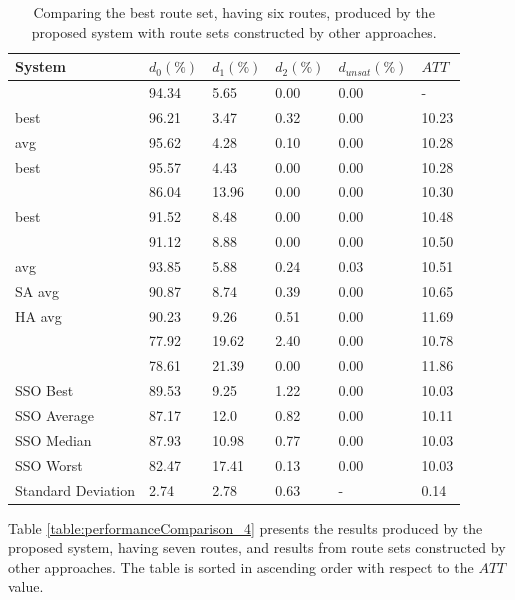 \begin{table}[H]
    \centering
    \hspace*{-1.0cm}
    \begin{tabular}{|l||l|l|l|l|l|}
    \hline
    \textbf{System} & $d_0(\%)$ & $d_1(\%)$ & $d_2(\%)$ & $d_{unsat}(\%)$ & $ATT$ \\
    \hline
    \citet{nikolic14} & 94.34 & 5.65 & 0.00 & 0.00 & - \\
    \citet{kechagiopoulos14} best & 96.21 & 3.47 & 0.32 & 0.00 & 10.23 \\
    \citet{kechagiopoulos14} avg & 95.62 & 4.28 & 0.10 & 0.00 & 10.28 \\
    \citet{chew12} best & 95.57 & 4.43 & 0.00 & 0.00 & 10.28 \\
    \citet{chakroborty02} & 86.04 & 13.96 & 0.00 & 0.00 & 10.30 \\
    \citet{fan10} best & 91.52 & 8.48 & 0.00 & 0.00 & 10.48  \\
    \citet{zhang10} & 91.12 & 8.88 & 0.00 & 0.00 & 10.50 \\
    \citet{chew12} avg & 93.85 & 5.88 & 0.24 & 0.03 & 10.51 \\
    \citet{fan10} SA avg & 90.87 & 8.74 & 0.39 & 0.00 & 10.65 \\
    \citet{fan10} HA avg & 90.23 & 9.26 & 0.51 & 0.00 & 11.69 \\
    \citet{kidwai98} & 77.92 & 19.62 & 2.40 & 0.00 & 10.78 \\
    \citet{baaj91} & 78.61 & 21.39 & 0.00 & 0.00 & 11.86 \\
    \hline
    SSO Best & 89.53 & 9.25 & 1.22 & 0.00 & 10.03\\
    SSO Average & 87.17 & 12.0 & 0.82 & 0.00 & 10.11\\
    SSO Median & 87.93 & 10.98 & 0.77 & 0.00 & 10.03\\
    SSO Worst & 82.47 & 17.41 & 0.13 & 0.00 & 10.03\\
    Standard Deviation & 2.74 & 2.78 & 0.63 & - & 0.14\\
    \hline
    \end{tabular}
    \caption {Comparing the best route set, having six routes, produced by the proposed system with route sets constructed by other approaches.}
    \label{table:performanceComparison_6}
\end{table}

Table \vref{table:performanceComparison_4} presents the results produced by the proposed system, having seven routes, and results from route sets constructed by other approaches. The table is sorted in ascending order with respect to the $ATT$ value.

